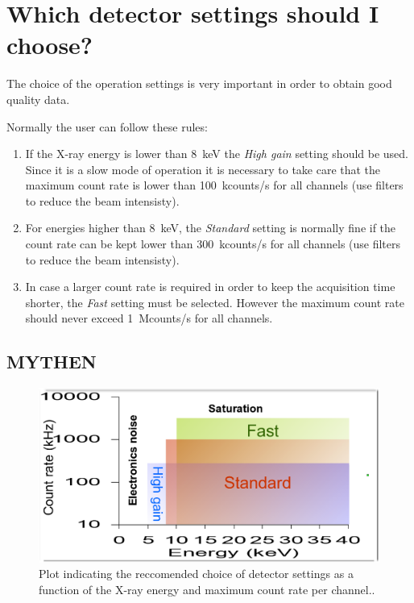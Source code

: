 

\section{Which detector settings should I choose?}

The choice of the operation settings is very important in order to obtain good quality data. 


Normally the user can follow these rules:
\begin{enumerate}
\item If the X-ray energy is lower than 8~keV the \textit{High gain} setting should be used. Since it is a slow mode of operation it is necessary to take care that the maximum count rate is lower than 100~kcounts/s for all channels (use filters to reduce the beam intensisty).
\item For energies higher than 8~keV, the \textit{Standard} setting is normally fine if the count rate can be kept lower than 300~kcounts/s for all channels (use filters to reduce the beam intensisty). 

\item In case a larger count rate is required in order to keep the acquisition time shorter, the \textit{Fast} setting must be selected. However the maximum count rate should never exceed 1~Mcounts/s   for all channels.
\end{enumerate}

\subsection{MYTHEN}


\begin{figure}
\begin{center}
\includegraphics[width=\textwidth]{images/settings}
\end{center}
\caption{Plot indicating the reccomended choice of detector settings as a function of the X-ray energy and maximum count rate per channel..}\label{fig:settings}
\end{figure}


